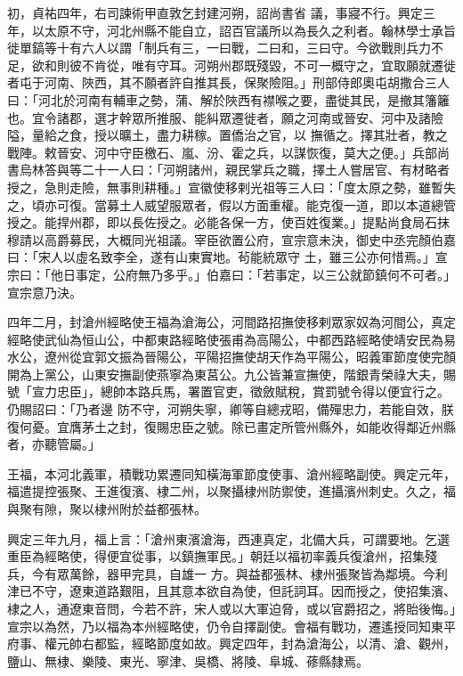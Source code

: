 \begin{pinyinscope}
 初，貞祐四年，右司諫術甲直敦乞封建河朔，詔尚書省
 議，事寢不行。興定三年，以太原不守，河北州縣不能自立，詔百官議所以為長久之利者。翰林學士承旨徙單鎬等十有六人以謂「制兵有三，一曰戰，二曰和，三曰守。今欲戰則兵力不足，欲和則彼不肯從，唯有守耳。河朔州郡既殘毀，不可一概守之，宜取願就遷徙者屯于河南、陜西，其不願者許自推其長，保聚險阻。」刑部侍郎奧屯胡撒合三人曰：「河北於河南有輔車之勢，蒲、解於陜西有襟喉之要，盡徙其民，是撤其籓籬也。宜令諸郡，選才幹眾所推服、能糾眾遷徙者，願之河南或晉安、河中及諸險隘，量給之食，授以曠土，盡力耕稼。置僑治之官，以
 撫循之。擇其壯者，教之戰陣。敕晉安、河中守臣檄石、嵐、汾、霍之兵，以謀恢復，莫大之便。」兵部尚書烏林答與等二十一人曰：「河朔諸州，親民掌兵之職，擇土人嘗居官、有材略者授之，急則走險，無事則耕種。」宣徽使移剌光祖等三人曰：「度太原之勢，雖暫失之，頃亦可復。當募土人威望服眾者，假以方面重權。能克復一道，即以本道總管授之。能捍州郡，即以長佐授之。必能各保一方，使百姓復業。」提點尚食局石抹穆請以高爵募民，大概同光祖議。宰臣欲置公府，宣宗意未決，御史中丞完顏伯嘉曰：「宋人以虛名致李全，遂有山東實地。茍能統眾守
 土，雖三公亦何惜焉。」宣宗曰：「他日事定，公府無乃多乎。」伯嘉曰：「若事定，以三公就節鎮何不可者。」宣宗意乃決。



 四年二月，封滄州經略使王福為滄海公，河間路招撫使移剌眾家奴為河間公，真定經略使武仙為恒山公，中都東路經略使張甫為高陽公，中都西路經略使靖安民為易水公，遼州從宜郭文振為晉陽公，平陽招撫使胡天作為平陽公，昭義軍節度使完顏開為上黨公，山東安撫副使燕寧為東莒公。九公皆兼宣撫使，階銀青榮祿大夫，賜號「宣力忠臣」，總帥本路兵馬，署置官吏，徵斂賦稅，賞罰號令得以便宜行之。仍賜詔曰：「乃者邊
 防不守，河朔失寧，卿等自總戎昭，備殫忠力，若能自效，朕復何憂。宜膺茅土之封，復賜忠臣之號。除已畫定所管州縣外，如能收得鄰近州縣者，亦聽管屬。」



 王福，本河北義軍，積戰功累遷同知橫海軍節度使事、滄州經略副使。興定元年，福遣提控張聚、王進復濱、棣二州，以聚攝棣州防禦使，進攝濱州刺史。久之，福與聚有隙，聚以棣州附於益都張林。



 興定三年九月，福上言：「滄州東濱滄海，西連真定，北備大兵，可謂要地。乞選重臣為經略使，得便宜從事，以鎮撫軍民。」朝廷以福初率義兵復滄州，招集殘兵，今有眾萬餘，器甲完具，自雄一
 方。與益都張林、棣州張聚皆為鄰境。今利津已不守，遼東道路艱阻，且其意本欲自為使，但託詞耳。因而授之，使招集濱、棣之人，通遼東音問，今若不許，宋人或以大軍迫脅，或以官爵招之，將貽後悔。」宣宗以為然，乃以福為本州經略使，仍令自擇副使。會福有戰功，遷遙授同知東平府事、權元帥右都監，經略節度如故。興定四年，封為滄海公，以清、滄、觀州，鹽山、無棣、樂陵、東光、寧津、吳橋、將陵、阜城、蓚縣隸焉。




\end{pinyinscope}
